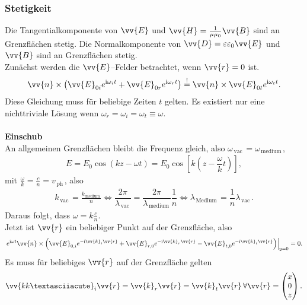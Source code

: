 \documentclass[a4paper,12pt]{article}
\numberwithin{equation}{section}
\begin{document}
\subsubsection{Stetigkeit}
Die Tangentialkomponente von $\vv{E}$ und $\vv{H}=\tfrac{1}{\mu \mu _0}\vv{B}$ sind an Grenzflächen stetig. Die Normalkomponente von $\vv{D}=\varepsilon \varepsilon _0\vv{E}$ und $\vv{B}$ sind an Grenzflächen stetig.\\\indent
Zunächst werden die $\vv{E}$--Felder betrachtet, wenn $\vv{r}=0$ ist.
\begin{align} 
        \vv{n}\times \left(\vv{E}_{0i}e^{\text{i}\omega _it}+\vv{E}_{0r}e^{\text{i}\omega _rt}\right)\stackrel{!}{=}\vv{n}\times \vv{E}_{0t}e^{\text{i}\omega _tt}
.\end{align} 
Diese Gleichung muss für beliebige Zeiten $t$ gelten. Es existiert nur eine nichttriviale Lösung wenn $\omega _r=\omega _i=\omega _t\equiv \omega $.
\\\hfill\\\textbf{Einschub}\\ 
An allgemeinen Grenzflächen bleibt die Frequenz gleich, also $\omega _{\,\text{vac}\,}=\omega _{\,\text{medium}\,}$,
\begin{align} 
        E=E_0\cos \left(kz-\omega t\right)=E_0\cos \left[k\left(z-\dfrac{\omega }{k}t\right)\right]
,\end{align} 
mit $\tfrac{\omega }{k}=\tfrac{c}{n}=v_{\,\text{ph}\,}$, also 
\begin{align} 
k_{\,\text{vac}\,}=\tfrac{k_{\,\text{medium}\,}}{n}\Leftrightarrow \dfrac{2\pi }{\lambda _{\,\text{vac}\,}}=\dfrac{2\pi }{\lambda _{\,\text{medium}\,}}\dfrac{1}{n}\Leftrightarrow \lambda _{\,\text{Medium}\,}=\dfrac{1}{n}\lambda _{\,\text{vac}\,}
.\end{align} 
Daraus folgt, dass $\omega =k\tfrac{c}{n}$.\\\indent
Jetzt ist $\vv{r}$ ein beliebiger Punkt auf der Grenzfläche, also
\begin{align} 
        \left.e^{\text{i}\omega t}\vv{n}\times \left(\vv{E}_{0,i}e^{-\text{i}\vv{k}_i\vv{r}}+\vv{E}_{r,0}e^{-\text{i}\vv{k}_r\vv{r}}-\vv{E}_{t,0}e^{-\text{i}\vv{k}_t\vv{r}}\right)\right|_{y=0}=0
.\end{align} 
Es muss für beliebiges $\vv{r}$ auf der Grenzfläche gelten
\begin{align} 
        \vv{kk´}_i\vv{r}=\vv{k}_r\vv{r}=\vv{k}_t\vv{r}\,\forall \vv{r}=\begin{pmatrix}
                x\\0\\z
        \end{pmatrix}
.\end{align} 
\end{document}
